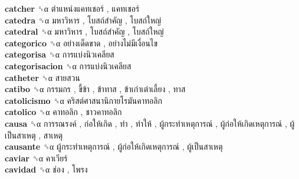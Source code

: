 \textbf{catcher} ␝α   ตำแหน่งแคทเชอร์ ,  แคทเชอร์   \\
\textbf{catedra} ␝α   มหาวิหาร ,  โบสถ์สำคัญ ,  โบสถ์ใหญ่   \\
\textbf{catedral} ␝α   มหาวิหาร ,  โบสถ์สำคัญ ,  โบสถ์ใหญ่   \\
\textbf{categorico} ␝α   อย่างเด็ดขาด ,  อย่างไม่มีเงื่อนไข   \\
\textbf{categorisa} ␝α   การแบ่งนิวเคลียส   \\
\textbf{categorisacion} ␝α   การแบ่งนิวเคลียส   \\
\textbf{catheter} ␝α   สายสวน   \\
\textbf{catibo} ␝α   กรรมกร ,  ขี้ข้า ,  ข้าทาส ,  ข้าเก่าเต่าเลี้ยง ,  ทาส   \\
\textbf{catolicismo} ␝α   คริสต์ศาสนานิกายโรมันคาทอลิก   \\
\textbf{catolico} ␝α   คาทอลิก ,  ชาวคาทอลิก   \\
\textbf{causa} ␝α   การรณรงค์ ,  ก่อให้เกิด ,  ทำ ,  ทำให้ ,  ผู้กระทำเหตุการณ์ ,  ผู้ก่อให้เกิดเหตุการณ์ ,  ผู้เป็นสาเหตุ ,  สาเหตุ   \\
\textbf{causante} ␝α   ผู้กระทำเหตุการณ์ ,  ผู้ก่อให้เกิดเหตุการณ์ ,  ผู้เป็นสาเหตุ   \\
\textbf{caviar} ␝α   คาเวียร์   \\
\textbf{cavidad} ␝α   ช่อง ,  โพรง   \\

